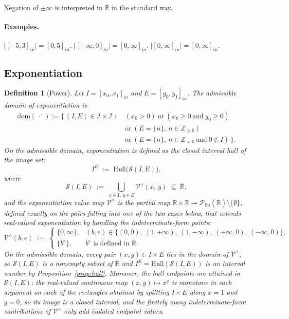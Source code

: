 \documentclass[11pt,a4paper]{article}
\theoremstyle{paperdef}
\newtheorem{definition}[theorem]{Definition}
\newcommand{\Rext}{\overline{\mathbb{R}}}
\newcommand{\Iset}{\mathcal{I}}
\newcommand{\inI}[1]{[#1]_{in}}
\newcommand{\Vhat}{\mathcal{V}^{\wedge}}
\begin{document}
Negation of $\pm\infty$ is interpreted in $\Rext$ in the standard way.

\paragraph{Examples.}
$\lvert \inI{-5, 3} \rvert = \inI{0, 5}$.
$\lvert \inI{-\infty, 0} \rvert = \inI{0, \infty}$.
$\lvert \inI{0, \infty} \rvert = \inI{0, \infty}$.

\subsection{Exponentiation}\label{sec:exponentiation}

\begin{definition}[Power]\label{def:power}
Let $I = \inI{x_0, x_1}$ and $E = \inI{y_0, y_1}$. The
\emph{admissible domain} of exponentiation is
\begin{align*}
\mathrm{dom}(\,\cdot^{\,\cdot}) := \{\, (I, E) \in \Iset \times \Iset \;:\;
& (x_0 > 0) \;\text{or}\; (x_0 \ge 0\ \text{and}\ y_0 \ge 0)\\
& \text{or}\; (E = \{n\},\ n \in \mathbb{Z}_{\ge 0})\\
& \text{or}\; (E = \{n\},\ n \in \mathbb{Z}_{<0}\ \text{and}\ 0 \notin I)\,\}.
\end{align*}
On the admissible domain, exponentiation is defined as the closed
interval hull of the image set:
\[
I^{E} \;:=\; \mathrm{Hull}\bigl(\mathcal{S}(I, E)\bigr),
\]
where
\[
\mathcal{S}(I, E) \;:=\; \bigcup_{x \in I,\ y \in E} \Vhat(x,\, y)
\;\subseteq\; \Rext,
\]
and the exponentiation value map $\Vhat$ is the \emph{partial} map
$\Rext \times \Rext \rightharpoonup
\mathcal{P}_{\mathrm{fin}}(\Rext) \setminus \{\emptyset\}$, defined
exactly on the pairs falling into one of the two cases below, that
extends real-valued exponentiation by handling the
indeterminate-form points:
\[
\Vhat(b, e) \;:=\;
\begin{cases}
\{0, \infty\}, & (b, e) \in \{(0,0),\ (1, +\infty),\ (1, -\infty),
\ (+\infty, 0),\ (-\infty, 0)\}, \\
\{b^{e}\}, & b^{e} \text{ is defined in } \Rext.
\end{cases}
\]
On the admissible domain, every pair $(x, y) \in I \times E$ lies in
the domain of $\Vhat$, so $\mathcal{S}(I, E)$ is a nonempty subset of
$\Rext$ and $I^{E} = \mathrm{Hull}(\mathcal{S}(I, E))$ is an interval
number by Proposition~\ref{prop:hull}. Moreover, the hull endpoints
are \emph{attained} in $\mathcal{S}(I, E)$: the real-valued
continuous map $(x, y) \mapsto x^{y}$ is monotone in each argument on
each of the rectangles obtained by splitting $I \times E$ along
$x = 1$ and $y = 0$, so its image is a closed interval, and the
finitely many indeterminate-form contributions of $\Vhat$ only add
isolated endpoint values.
\end{definition}
\end{document}
